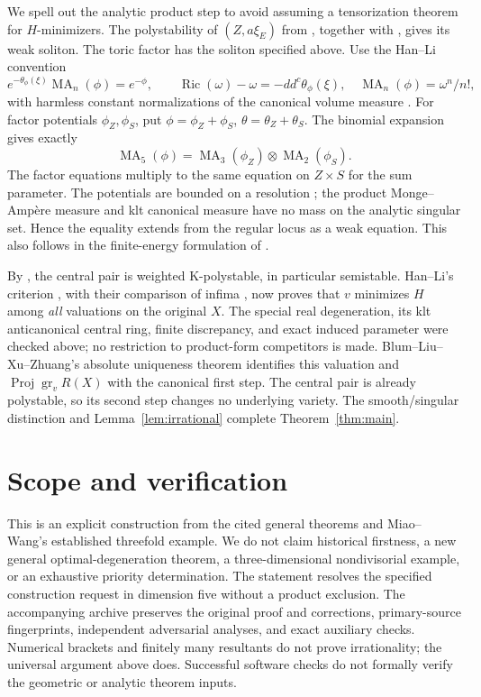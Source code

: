 \documentclass[11pt,a4paper]{article}
\newcommand{\gr}{\operatorname{gr}}
\newcommand{\Proj}{\operatorname{Proj}}
\newcommand{\MA}{\operatorname{MA}}
\newcommand{\Ric}{\operatorname{Ric}}
\begin{document}
We spell out the analytic product step to avoid assuming a tensorization
theorem for \(H\)-minimizers. The polystability of \((Z,a\xi_E)\)
from \cite{MW}, together with \cite{BLXZ,HLYTD}, gives its weak soliton.
The toric factor has the soliton specified above.
Use the Han--Li convention
\[
 e^{-\theta_\phi(\xi)}\MA_n(\phi)=e^{-\phi},\qquad
 \Ric(\omega)-\omega=-dd^c\theta_\phi(\xi),
 \quad \MA_n(\phi)=\omega^n/n!,
\]
with harmless constant normalizations of the canonical volume measure
\cite[(110)--(111), Remark~2.45]{HL}.
For factor potentials \(\phi_Z,\phi_S\), put
\(\phi=\phi_Z+\phi_S\), \(\theta=\theta_Z+\theta_S\).
The binomial expansion gives exactly
\[
 \MA_5(\phi)=\MA_3(\phi_Z)\otimes\MA_2(\phi_S).
\]
The factor equations multiply to the same equation on \(Z\times S\)
for the sum parameter. The potentials are bounded on a resolution
\cite[Corollary~31, Proposition~32]{HLYTD};
the product Monge--Ampère measure and klt canonical measure have
no mass on the analytic singular set. Hence the equality extends
from the regular locus as a weak equation. This also follows in the
finite-energy formulation of \cite{HLYTD}.

By \cite[Theorem~1.3]{BLXZ}, the central pair is weighted K-polystable,
in particular semistable.
Han--Li's criterion \cite[Theorem~5.3]{HL}, with their comparison
of infima \cite[Theorem~1.5]{HL}, now proves that \(v\) minimizes
\(H\) among \emph{all} valuations on the original \(X\).
The special real degeneration, its klt anticanonical central ring,
finite discrepancy, and exact induced parameter were checked above;
no restriction to product-form competitors is made.
Blum--Liu--Xu--Zhuang's absolute uniqueness theorem
\cite[Theorem~1.2]{BLXZ} identifies this valuation and
\(\Proj\gr_vR(X)\) with the canonical first step.
The central pair is already polystable, so its second step changes
no underlying variety. The smooth/singular distinction and
Lemma~\ref{lem:irrational} complete Theorem~\ref{thm:main}.

\section{Scope and verification}

This is an explicit construction from the cited general theorems and
Miao--Wang's established threefold example. We do not claim historical
firstness, a new general optimal-degeneration theorem, a
three-dimensional nondivisorial example, or an exhaustive priority
determination. The statement resolves the specified construction
request in dimension five without a product exclusion.
The accompanying archive preserves the original proof and corrections,
primary-source fingerprints, independent adversarial analyses, and
exact auxiliary checks. Numerical brackets and finitely many
resultants do not prove irrationality; the universal argument above does.
Successful software checks do not formally verify the geometric or
analytic theorem inputs.
\end{document}
